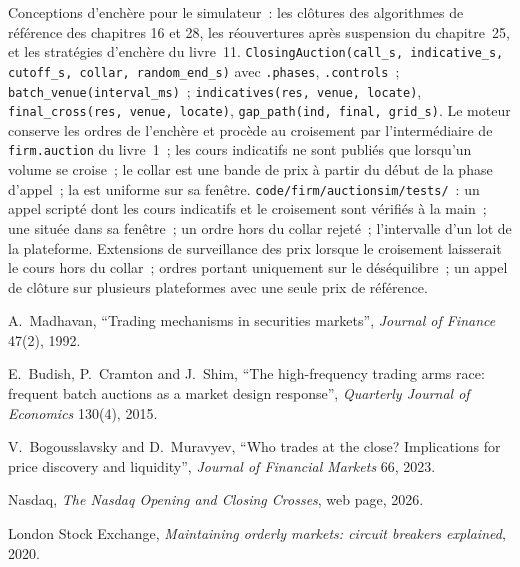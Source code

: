 \begin{build}
 Conceptions d'enchère pour le simulateur~: les clôtures des algorithmes de référence des chapitres 16 et 28, les réouvertures après suspension du chapitre~25, et
les stratégies d'enchère du livre~11.
 \texttt{ClosingAuction(call\_s, indicative\_s, cutoff\_s, collar, random\_end\_s)} avec \texttt{.phases}, \texttt{.controls}~;
\texttt{batch\_venue(interval\_ms)}~; \texttt{indicatives(res, venue, locate)}, \texttt{final\_cross(res, venue, locate)},
\texttt{gap\_path(ind, final, grid\_s)}.
 Le moteur conserve les ordres de l'enchère et procède au croisement par l'intermédiaire de \texttt{firm.auction} du livre~1~; les cours indicatifs ne sont publiés que lorsqu'un volume
se croise~; le collar est une bande de prix à partir du début de la phase d'appel~; la  est uniforme sur sa fenêtre.
 \texttt{code/firm/auctionsim/tests/}~: un appel scripté dont les cours indicatifs et le croisement sont vérifiés à la main~; une  située dans sa
fenêtre~; un ordre hors du collar rejeté~; l'intervalle d'un lot de la plateforme.
 Extensions de surveillance des prix lorsque le croisement laisserait le cours hors du collar~; ordres portant uniquement sur le déséquilibre~; un appel de clôture sur plusieurs plateformes avec une seule
prix de référence.
\end{build}

\begin{omsources}
\item A.~Madhavan, ``Trading mechanisms in securities markets'', \emph{Journal of Finance} 47(2), 1992.
\item E.~Budish, P.~Cramton and J.~Shim, ``The high-frequency trading arms race: frequent batch auctions as a market design response'', \emph{Quarterly
Journal of Economics} 130(4), 2015.
\item V.~Bogousslavsky and D.~Muravyev, ``Who trades at the close? Implications for price discovery and liquidity'', \emph{Journal of Financial Markets}
66, 2023.
\item Nasdaq, \emph{The Nasdaq Opening and Closing Crosses}, web page, 2026.
\item London Stock Exchange, \emph{Maintaining orderly markets: circuit breakers explained}, 2020.
\end{omsources}


